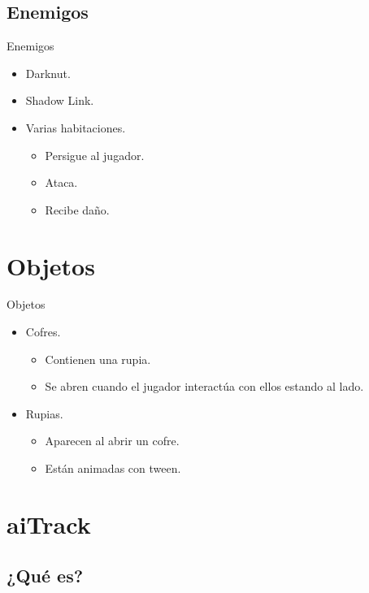 \documentclass{beamer}
\begin{document}
\subsection{Enemigos}

\begin{frame}{Enemigos}
	\begin{itemize}
		\item Darknut.
		\item Shadow Link.
		\item Varias habitaciones.
		      \begin{itemize}
			      \item Persigue al jugador.
			      \item Ataca.
			      \item Recibe daño.
		      \end{itemize}
	\end{itemize}
\end{frame}

\section{Objetos}

\begin{frame}{Objetos}
	\begin{itemize}
		\item Cofres.
		      \begin{itemize}
			      \item Contienen una rupia.
			      \item Se abren cuando el jugador interactúa con ellos estando al lado.
		      \end{itemize}
		      \medskip
		\item Rupias.
		      \begin{itemize}
			      \item Aparecen al abrir un cofre.
			      \item Están animadas con tween.
		      \end{itemize}
	\end{itemize}
\end{frame}

\section{aiTrack}

\subsection{¿Qué es?}
\end{document}
